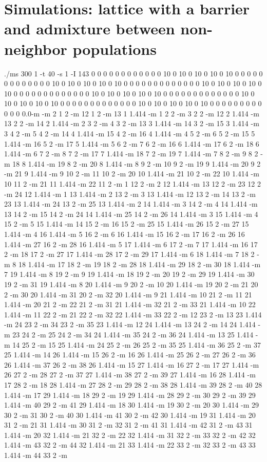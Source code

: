 \documentclass[12pt]{article}
\begin{document}
\section*{Simulations: lattice with a barrier and admixture between non-neighbor populations}
./ms 300 1 -t 40 -s 1 -I 143 0 0 0 0 0 0 0 0 0 0 0 0 10 0 10 0 10 0 10 0 10 0 0 0 0 0 0 0 0 0 0 0 0 0 10 0 10 0 10 0 10 0 10 0 0 0 0 0 0 0 0 0 0 0 0 0 10 0 10 0 10 0 10 0 10 0 0 0 0 0 0 0 0 0 0 0 0 0 10 0 10 0 10 0 10 0 10 0 0 0 0 0 0 0 0 0 0 0 0 0 10 0 10 0 10 0 10 0 10 0 0 0 0 0 0 0 0 0 0 0 0 0 10 0 10 0 10 0 10 0 10 0 0 0 0 0 0 0 0 0 0 0 0 0.0-m -m 2 1 2 -m 12 1 2 -m 13 1 1.414 -m 1 2 2 -m 3 2 2 -m 12 2 1.414 -m 13 2 2 -m 14 2 1.414 -m 2 3 2 -m 4 3 2 -m 13 3 1.414 -m 14 3 2 -m 15 3 1.414 -m 3 4 2 -m 5 4 2 -m 14 4 1.414 -m 15 4 2 -m 16 4 1.414 -m 4 5 2 -m 6 5 2 -m 15 5 1.414 -m 16 5 2 -m 17 5 1.414 -m 5 6 2 -m 7 6 2 -m 16 6 1.414 -m 17 6 2 -m 18 6 1.414 -m 6 7 2 -m 8 7 2 -m 17 7 1.414 -m 18 7 2 -m 19 7 1.414 -m 7 8 2 -m 9 8 2 -m 18 8 1.414 -m 19 8 2 -m 20 8 1.414 -m 8 9 2 -m 10 9 2 -m 19 9 1.414 -m 20 9 2 -m 21 9 1.414 -m 9 10 2 -m 11 10 2 -m 20 10 1.414 -m 21 10 2 -m 22 10 1.414 -m 10 11 2 -m 21 11 1.414 -m 22 11 2 -m 1 12 2 -m 2 12 1.414 -m 13 12 2 -m 23 12 2 -m 24 12 1.414 -m 1 13 1.414 -m 2 13 2 -m 3 13 1.414 -m 12 13 2 -m 14 13 2 -m 23 13 1.414 -m 24 13 2 -m 25 13 1.414 -m 2 14 1.414 -m 3 14 2 -m 4 14 1.414 -m 13 14 2 -m 15 14 2 -m 24 14 1.414 -m 25 14 2 -m 26 14 1.414 -m 3 15 1.414 -m 4 15 2 -m 5 15 1.414 -m 14 15 2 -m 16 15 2 -m 25 15 1.414 -m 26 15 2 -m 27 15 1.414 -m 4 16 1.414 -m 5 16 2 -m 6 16 1.414 -m 15 16 2 -m 17 16 2 -m 26 16 1.414 -m 27 16 2 -m 28 16 1.414 -m 5 17 1.414 -m 6 17 2 -m 7 17 1.414 -m 16 17 2 -m 18 17 2 -m 27 17 1.414 -m 28 17 2 -m 29 17 1.414 -m 6 18 1.414 -m 7 18 2 -m 8 18 1.414 -m 17 18 2 -m 19 18 2 -m 28 18 1.414 -m 29 18 2 -m 30 18 1.414 -m 7 19 1.414 -m 8 19 2 -m 9 19 1.414 -m 18 19 2 -m 20 19 2 -m 29 19 1.414 -m 30 19 2 -m 31 19 1.414 -m 8 20 1.414 -m 9 20 2 -m 10 20 1.414 -m 19 20 2 -m 21 20 2 -m 30 20 1.414 -m 31 20 2 -m 32 20 1.414 -m 9 21 1.414 -m 10 21 2 -m 11 21 1.414 -m 20 21 2 -m 22 21 2 -m 31 21 1.414 -m 32 21 2 -m 33 21 1.414 -m 10 22 1.414 -m 11 22 2 -m 21 22 2 -m 32 22 1.414 -m 33 22 2 -m 12 23 2 -m 13 23 1.414 -m 24 23 2 -m 34 23 2 -m 35 23 1.414 -m 12 24 1.414 -m 13 24 2 -m 14 24 1.414 -m 23 24 2 -m 25 24 2 -m 34 24 1.414 -m 35 24 2 -m 36 24 1.414 -m 13 25 1.414 -m 14 25 2 -m 15 25 1.414 -m 24 25 2 -m 26 25 2 -m 35 25 1.414 -m 36 25 2 -m 37 25 1.414 -m 14 26 1.414 -m 15 26 2 -m 16 26 1.414 -m 25 26 2 -m 27 26 2 -m 36 26 1.414 -m 37 26 2 -m 38 26 1.414 -m 15 27 1.414 -m 16 27 2 -m 17 27 1.414 -m 26 27 2 -m 28 27 2 -m 37 27 1.414 -m 38 27 2 -m 39 27 1.414 -m 16 28 1.414 -m 17 28 2 -m 18 28 1.414 -m 27 28 2 -m 29 28 2 -m 38 28 1.414 -m 39 28 2 -m 40 28 1.414 -m 17 29 1.414 -m 18 29 2 -m 19 29 1.414 -m 28 29 2 -m 30 29 2 -m 39 29 1.414 -m 40 29 2 -m 41 29 1.414 -m 18 30 1.414 -m 19 30 2 -m 20 30 1.414 -m 29 30 2 -m 31 30 2 -m 40 30 1.414 -m 41 30 2 -m 42 30 1.414 -m 19 31 1.414 -m 20 31 2 -m 21 31 1.414 -m 30 31 2 -m 32 31 2 -m 41 31 1.414 -m 42 31 2 -m 43 31 1.414 -m 20 32 1.414 -m 21 32 2 -m 22 32 1.414 -m 31 32 2 -m 33 32 2 -m 42 32 1.414 -m 43 32 2 -m 44 32 1.414 -m 21 33 1.414 -m 22 33 2 -m 32 33 2 -m 43 33 1.414 -m 44 33 2 -m 
\end{document}
